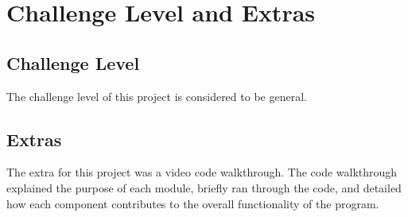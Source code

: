 \documentclass{article}
\begin{document}
\section{Challenge Level and Extras}

\subsection{Challenge Level}

The challenge level of this project is considered to be general.

\subsection{Extras}

The extra for this project was a video code walkthrough. The code walkthrough
explained the purpose of each module, briefly ran through the code, and
detailed how each component contributes to the overall functionality of the
program.






\end{document}
